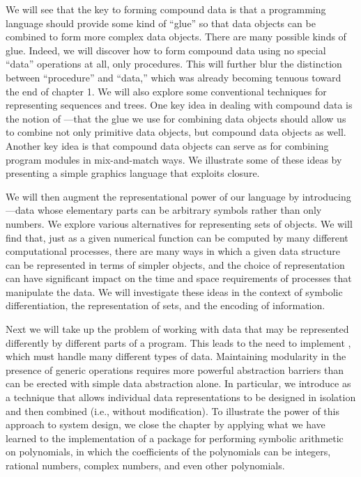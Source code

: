 We will see that the key to forming compound data is that a programming
language should provide some kind of ``glue'' so that data objects can be
combined to form more complex data objects.  There are many possible kinds of
glue.  Indeed, we will discover how to form compound data using no special
``data'' operations at all, only procedures.  This will further blur the
distinction between ``procedure'' and ``data,'' which was already becoming
tenuous toward the end of chapter 1.  We will also explore some
conventional techniques for representing sequences and trees.  One key idea in
dealing with compound data is the notion of ---that the glue
we use for combining data objects should allow us to combine not only primitive
data objects, but compound data objects as well.  Another key idea is that
compound data objects can serve as  for
combining program modules in mix-and-match ways.  We illustrate some of these
ideas by presenting a simple graphics language that exploits closure.

\enlargethispage{\baselineskip}

We will then augment the representational power of our language by introducing
---data whose elementary parts can be arbitrary
symbols rather than only numbers.  We explore various alternatives for
representing sets of objects.  We will find that, just as a given numerical
function can be computed by many different computational processes, there are
many ways in which a given data structure can be represented in terms of
simpler objects, and the choice of representation can have significant impact
on the time and space requirements of processes that manipulate the data.  We
will investigate these ideas in the context of symbolic differentiation, the
representation of sets, and the encoding of information.

Next we will take up the problem of working with data that may be represented
differently by different parts of a program.  This leads to the need to
implement , which must handle many different types
of data.  Maintaining modularity in the presence of generic operations requires
more powerful abstraction barriers than can be erected with simple data
abstraction alone.  In particular, we introduce  as a technique that allows individual data representations to be
designed in isolation and then combined  (i.e., without
modification).  To illustrate the power of this approach to system design, we
close the chapter by applying what we have learned to the implementation of a
package for performing symbolic arithmetic on polynomials, in which the
coefficients of the polynomials can be integers, rational numbers, complex
numbers, and even other polynomials.






